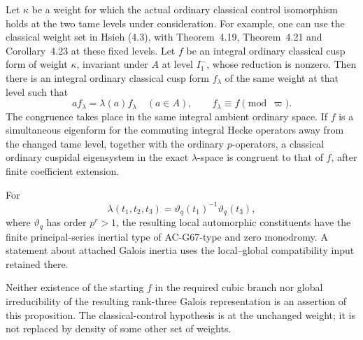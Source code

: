 \begin{proposition}
\label{AC-G71}
Let $\kappa$ be a weight for which the actual ordinary classical
control isomorphism holds at the two tame levels under
consideration.  For example, one can use the classical weight
set in Hsieh (4.3), with Theorem~4.19, Theorem~4.21 and
Corollary~4.23 at these fixed levels.  Let $f$ be an integral
ordinary classical cusp form of weight $\kappa$, invariant
under $A$ at level $I_1^-$, whose reduction is nonzero.  Then
there is an integral ordinary classical cusp form $f_\lambda$
of the same weight at that level such that
\[
 a f_\lambda=\lambda(a)f_\lambda\quad(a\in A),
                 \qquad f_\lambda\equiv f\pmod\varpi.
                                                        \tag{CT.2}
\]
The congruence takes place in the same integral ambient
ordinary space.  If $f$ is a simultaneous eigenform for the
commuting integral Hecke operators away from the changed tame
level, together with the ordinary $p$-operators, a classical
ordinary cuspidal eigensystem in the exact $\lambda$-space is
congruent to that of $f$, after finite coefficient extension.

For
\[
       \lambda(t_1,t_2,t_3)=\vartheta_q(t_1)^{-1}
                                      \vartheta_q(t_3),   \tag{CT.3}
\]
where $\vartheta_q$ has order $p^r>1$, the resulting local
automorphic constituents have the finite principal-series
inertial type of AC-G67-type and zero monodromy.  A statement
about attached Galois inertia uses the local--global
compatibility input retained there.

Neither existence of the starting $f$ in the required cubic
branch nor global irreducibility of the resulting rank-three
Galois representation is an assertion of this proposition.
The classical-control hypothesis is at the unchanged weight;
it is not replaced by density of some other set of weights.
\end{proposition}

